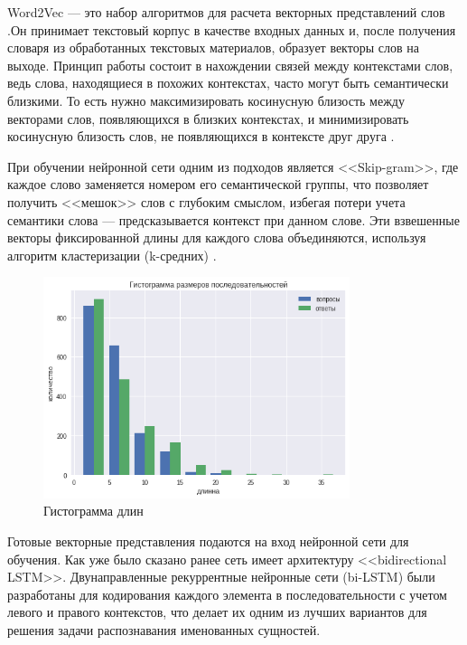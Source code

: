 Word2Vec — это набор алгоритмов для расчета векторных представлений слов \cite{word2vecproject}.Он принимает текстовый корпус в качестве входных данных и, после получения словаря из обработанных текстовых материалов, образует векторы слов на выходе. Принцип работы состоит в нахождении связей между контекстами слов, ведь слова, находящиеся в похожих контекстах, часто могут быть семантически близкими. То есть нужно максимизировать косинусную близость между векторами слов, появляющихся в близких контекстах, и минимизировать косинусную близость слов, не появляющихся в контексте друг друга \cite{word2vecproject}. 

При обучении нейронной сети одним из подходов является <<Skip-gram>>, где каждое слово заменяется номером его семантической группы, что позволяет получить <<мешок>> слов с глубоким смыслом, избегая потери учета семантики слова — предсказывается контекст при данном слове. Эти взвешенные векторы фиксированной длины для каждого слова объединяются, используя алгоритм кластеризации (k-средних) \cite{mikolov2013distributed, левченко2017разработка}.

\begin{figure}[H]
    \centering
    \includegraphics[width=0.8\textwidth]{image/hist_len.png}
    \caption{Гистограмма длин }
    \label{fig:len}
\end{figure}

Готовые векторные представления подаются на вход нейронной сети для обучения. Как уже было сказано ранее сеть имеет архитектуру <<bidirectional LSTM>>. Двунаправленные рекуррентные нейронные сети (bi-LSTM) \cite{hochreiter1997lstm} были разработаны для кодирования каждого элемента в последовательности с учетом левого и правого контекстов, что делает их одним из лучших вариантов для решения задачи распознавания именованных сущностей. 

